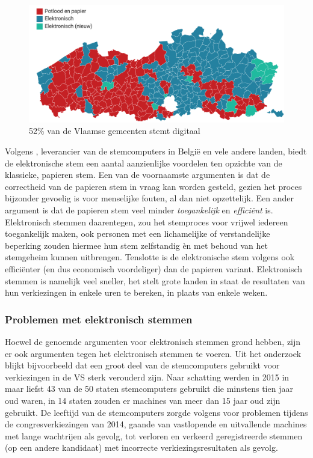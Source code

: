 			\begin{figure}
				\includegraphics[width=\linewidth]{img/evote_vlaanderen.png}
				\caption{52\% van de Vlaamse gemeenten stemt digitaal~\autocite{Hln2018}}
				\label{fig:evote_vlaanderen}
			\end{figure}
			
			Volgens \textcite{Smartmatic2018}, leverancier van de stemcomputers in België en vele andere landen, biedt de elektronische stem een aantal aanzienlijke voordelen ten opzichte van de klassieke, papieren stem. Een van de voornaamste argumenten is dat de correctheid van de papieren stem in vraag kan worden gesteld, gezien het proces bijzonder gevoelig is voor menselijke fouten, al dan niet opzettelijk. Een ander argument is dat de papieren stem veel minder \textit{toegankelijk} en \textit{efficiënt} is. Elektronisch stemmen daarentegen, zou het stemproces voor vrijwel iedereen toegankelijk maken, ook personen met een lichamelijke of verstandelijke beperking zouden hiermee hun stem zelfstandig èn met behoud van het stemgeheim kunnen uitbrengen. Tenslotte is de elektronische stem volgens \textcite{Smartmatic2018} ook efficiënter (en dus economisch voordeliger) dan de papieren variant. Elektronisch stemmen is namelijk veel sneller, het stelt grote landen in staat de resultaten van hun verkiezingen in enkele uren te bereken, in plaats van enkele weken. ~\autocite{Smartmatic2018}
			
			\subsubsection{Problemen met elektronisch stemmen}
			Hoewel de genoemde argumenten voor elektronisch stemmen grond hebben, zijn er ook argumenten tegen het elektronisch stemmen te voeren. Uit het onderzoek \textcite{Norden2015} blijkt bijvoorbeeld dat een groot deel van de stemcomputers gebruikt voor verkiezingen in de VS sterk verouderd zijn. Naar schatting werden in 2015 in maar liefst 43 van de 50 staten stemcomputers gebruikt die minstens tien jaar oud waren, in 14 staten zouden er machines van meer dan 15 jaar oud zijn gebruikt. De leeftijd van de stemcomputers zorgde volgens \textcite{Norden2015}  voor problemen tijdens de congresverkiezingen van 2014, gaande van vastlopende en uitvallende machines met lange wachtrijen als gevolg, tot verloren en verkeerd geregistreerde stemmen (op een andere kandidaat) met incorrecte verkiezingsresultaten als gevolg.
			
